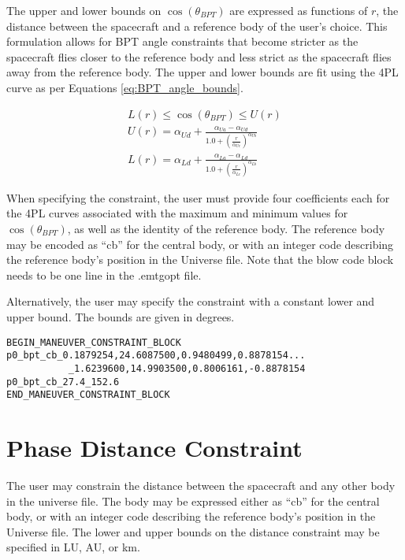 \documentclass[11pt]{article}
\begin{document}
The upper and lower bounds on $\cos \left(\theta_{BPT}\right)$ are expressed as functions of $r$, the distance between the spacecraft and a reference body of the user's choice. This formulation allows for BPT angle constraints that become stricter as the spacecraft flies closer to the reference body and less strict as the spacecraft flies away from the reference body. The upper and lower bounds are fit using the \ac{4PL} curve as per Equations \ref{eq:BPT_angle_bounds}.

\begin{equation}
	\label{eq:BPT_angle_bounds}
	\begin{aligned}
		L\left(r\right) \leq \cos \left(\theta_{BPT}\right) \leq U\left(r\right)\\
		U\left(r\right) = \alpha_{Ud} + \frac{\alpha_{Ua} - \alpha_{Ud}}{1.0 + \left(\frac{r}{\alpha_{Uc}}\right)^{\alpha_{Ub}}}\\
		L\left(r\right) = \alpha_{Ld} + \frac{\alpha_{La} - \alpha_{Ld}}{1.0 + \left(\frac{r}{\alpha_{Lc}}\right)^{\alpha_{Lb}}}
	\end{aligned}
\end{equation}

When specifying the constraint, the user must provide four coefficients each for the \ac{4PL} curves associated with the maximum and minimum values for $\cos \left(\theta_{BPT}\right)$, as well as the identity of the reference body. The reference body may be encoded as ``cb'' for the central body, or with an integer code describing the reference body's position in the Universe file. Note that the blow code block needs to be one line in the .emtgopt file.

Alternatively, the user may specify the constraint with a constant lower and upper bound. The bounds are given in degrees.

\begin{verbatim}
BEGIN_MANEUVER_CONSTRAINT_BLOCK
p0_bpt_cb_0.1879254,24.6087500,0.9480499,0.8878154...
           _1.6239600,14.9903500,0.8006161,-0.8878154
p0_bpt_cb_27.4_152.6
END_MANEUVER_CONSTRAINT_BLOCK
\end{verbatim}


\section{Phase Distance Constraint}
\label{sec:PhaseDistanceConstraint}

The user may constrain the distance between the spacecraft and any other body in the universe file. The body may be expressed either as ``cb'' for the central body, or with an integer code describing the reference body's position in the Universe file. The lower and upper bounds on the distance constraint may be specified in LU, AU, or km.
\end{document}
